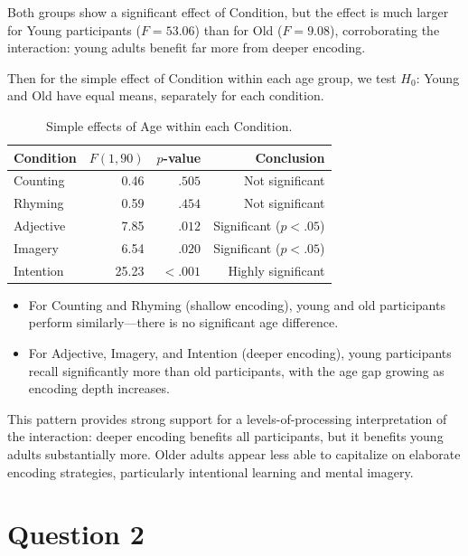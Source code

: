 \documentclass[letterpaper]{article}
\begin{document}
	Both groups show a significant effect of Condition, but the effect is {much larger for Young participants} ($F = 53.06$) than for Old ($F = 9.08$), corroborating the interaction: young adults benefit far more from deeper encoding.
	
	Then for the simple effect of Condition within each age group, we test $H_0$: Young and Old have equal means, separately for each condition.
	
	\begin{table}[H]
		\centering
		\begin{tabular}{lrrr}
			\toprule
			Condition & $F(1, 90)$ & $p$-value & Conclusion \\
			\midrule
			Counting   & 0.46 & $.505$ & Not significant \\
			Rhyming    & 0.59 & $.454$ & Not significant \\
			Adjective  & 7.85 & $.012$ & Significant ($p < .05$) \\
			Imagery    & 6.54 & $.020$ & Significant ($p < .05$) \\
			Intention  & 25.23 & $< .001$ & Highly significant \\
			\bottomrule
		\end{tabular}
		\caption{Simple effects of Age within each Condition.}
	\end{table}

	\begin{itemize}
		\item For {Counting} and {Rhyming} (shallow encoding), young and old participants perform similarly---there is no significant age difference.
		\item For {Adjective}, {Imagery}, and {Intention} (deeper encoding), young participants recall significantly more than old participants, with the age gap growing as encoding depth increases.
	\end{itemize}
	
	This pattern provides strong support for a {levels-of-processing interpretation of the interaction}: deeper encoding benefits all participants, but it benefits young adults substantially more. Older adults appear less able to capitalize on elaborate encoding strategies, particularly intentional learning and mental imagery.
	
	
	
	
	
	\clearpage
	
	\section{Question 2}
	
\end{document}
